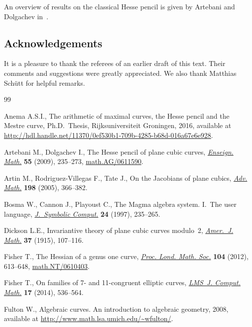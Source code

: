 \documentclass[pdftex]{sigma}
\numberwithin{equation}{section}
\begin{document}
An overview of results on the classical Hesse pencil is given by Artebani and Dolgachev in~\cite{artebani2009}.

\subsection*{Acknowledgements}
It is a pleasure to thank the referees of an earlier draft of this text. Their comments and suggestions were greatly appreciated. We also thank Matthias Sch\"{u}tt for helpful remarks.

\begin{thebibliography}{99}
\footnotesize\itemsep=0pt

Anema A.S.I., The arithmetic of maximal curves, the {H}esse pencil and the {M}estre
 curve, Ph.D.~Thesis, Rijksuniversiteit Groningen, 2016, available at
 \url{http://hdl.handle.net/11370/0ef530b1-709b-4285-b68d-016a67e6e928}.

Artebani M., Dolgachev I., The {H}esse pencil of plane cubic curves,
 \href{https://doi.org/10.4171/LEM/55-3-3}{\textit{Enseign. Math.}} \textbf{55} (2009), 235--273,
 \href{https://arxiv.org/abs/math.AG/0611590}{math.AG/0611590}.

Artin M., Rodriguez-Villegas F., Tate J., On the {J}acobians of plane cubics,
 \href{https://doi.org/10.1016/j.aim.2005.06.004}{\textit{Adv. Math.}} \textbf{198} (2005), 366--382.

Bosma W., Cannon J., Playoust C., The {M}agma algebra system. {I}.~{T}he user
 language, \href{https://doi.org/10.1006/jsco.1996.0125}{\textit{J.~Symbolic Comput.}} \textbf{24} (1997), 235--265.

Dickson L.E., Invariantive theory of plane cubic curves modulo~2,
 \href{https://doi.org/10.2307/2370419}{\textit{Amer.~J. Math.}} \textbf{37} (1915), 107--116.

Fisher T., The {H}essian of a genus one curve, \href{https://doi.org/10.1112/plms/pdr039}{\textit{Proc. Lond. Math. Soc.}}
 \textbf{104} (2012), 613--648, \href{https://arxiv.org/abs/math.NT/0610403}{math.NT/0610403}.

Fisher T., On families of 7- and 11-congruent elliptic curves, \href{https://doi.org/10.1112/S1461157014000059}{\textit{LMS~J.
 Comput. Math.}} \textbf{17} (2014), 536--564.

Fulton W., Algebraic curves. {A}n introduction to algebraic geometry, 2008,
 {a}vailable at \url{http://www.math.lsa.umich.edu/~wfulton/}.


\end{thebibliography}
\end{document}
